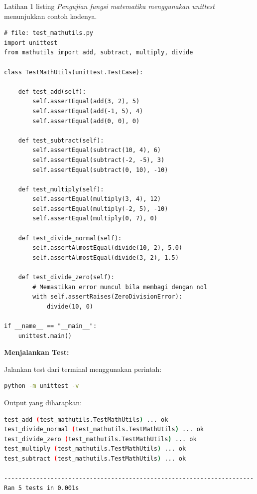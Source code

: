 \documentclass[aspectratio=169, table]{beamer}
\begin{document}
\begin{frame}[fragile,allowframebreaks=0.8]{Latihan 1}
listing \textit{Pengujian fungsi matematika menggunakan unittest} menunjukkan contoh kodenya.

\begin{lstlisting}[style=PythonStyle, breaklines=true]
# file: test_mathutils.py
import unittest
from mathutils import add, subtract, multiply, divide

class TestMathUtils(unittest.TestCase):

    def test_add(self):
        self.assertEqual(add(3, 2), 5)
        self.assertEqual(add(-1, 5), 4)
        self.assertEqual(add(0, 0), 0)

    def test_subtract(self):
        self.assertEqual(subtract(10, 4), 6)
        self.assertEqual(subtract(-2, -5), 3)
        self.assertEqual(subtract(0, 10), -10)

    def test_multiply(self):
        self.assertEqual(multiply(3, 4), 12)
        self.assertEqual(multiply(-2, 5), -10)
        self.assertEqual(multiply(0, 7), 0)

    def test_divide_normal(self):
        self.assertAlmostEqual(divide(10, 2), 5.0)
        self.assertAlmostEqual(divide(3, 2), 1.5)

    def test_divide_zero(self):
        # Memastikan error muncul bila membagi dengan nol
        with self.assertRaises(ZeroDivisionError):
            divide(10, 0)

if __name__ == "__main__":
    unittest.main()
\end{lstlisting}

\medskip\textbf{Menjalankan Test:}\par 
Jalankan test dari terminal menggunakan perintah:

\begin{lstlisting}[language=bash, breaklines=true, basicstyle=\ttfamily\scriptsize]
python -m unittest -v
\end{lstlisting}

Output yang diharapkan:

\begin{lstlisting}[language=bash, breaklines=true, basicstyle=\ttfamily\scriptsize]
test_add (test_mathutils.TestMathUtils) ... ok
test_divide_normal (test_mathutils.TestMathUtils) ... ok
test_divide_zero (test_mathutils.TestMathUtils) ... ok
test_multiply (test_mathutils.TestMathUtils) ... ok
test_subtract (test_mathutils.TestMathUtils) ... ok

----------------------------------------------------------------------
Ran 5 tests in 0.001s


\end{lstlisting}
\end{frame}
\end{document}
